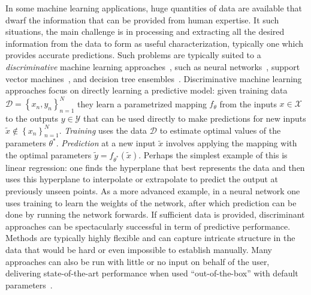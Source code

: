 
In some machine learning applications, huge quantities of data are available that dwarf the information
that can be provided from human expertise.  It such situations, the main challenge is in processing
and extracting all the desired information from the data to form as useful characterization,
typically
one which provides accurate predictions.  Such problems are typically suited to a \emph{discriminative} 
machine learning approaches~\citep{breiman2001statistical}, such as neural
networks~\citep{rumelhart1986learning,bishop1995neural}, 
support vector machines~\citep{cortes1995support,scholkopf2002learning}, and decision tree 
ensembles~\citep{breiman2001random,rainforth2015canonical}.  Discriminative machine learning approaches
focus on directly learning a predictive model: given training data $\mathcal{D} = \left\{x_n,y_n\right\}_{n=1}^N$
they learn a parametrized mapping $f_{\theta}$ from the inputs $x \in \mathcal{X}$ to the 
outputs $y\in\mathcal{Y}$ that can 
be used directly to make predictions 
for new inputs $\tilde{x} \notin \left\{x_n\right\}_{n=1}^N$.  \emph{Training}
uses the data $\mathcal{D}$ to estimate optimal values of the parameters $\theta^*$. \emph{Prediction}
at a new input $\tilde{x}$ involves applying the mapping with the optimal parameters
$\tilde{y} = f_{\theta^*}(\tilde{x})$.  Perhaps the simplest example of this is linear regression: one finds
the hyperplane that best represents the data and then uses this hyperplane to interpolate or extrapolate
to predict the output at previously unseen points.  
As a more advanced example, in a neural network one uses training to learn the
weights of the network, after which prediction can be done by running the network forwards.  If sufficient
data is provided, discriminant approaches can be spectacularly successful in term of predictive
performance.  Methods are typically highly flexible and can capture intricate structure in the data that
would be hard or even impossible to establish manually.  Many approaches can also be run with little
or no input on behalf of the user, delivering state-of-the-art performance when used
``out-of-the-box'' with default parameters~\citep{rainforth2015canonical}.

